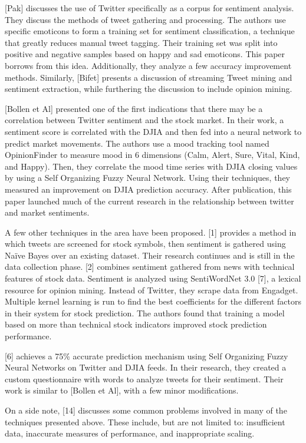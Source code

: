 \documentclass[preprint,pre,floats,aps,amsmath,amssymb,12pt]{revtex4}
\begin{document}
[Pak] discusses the use of Twitter specifically as a corpus for sentiment analysis. They discuss the methods of tweet gathering and processing. The authors use specific emoticons to form a training set for sentiment classification, a technique that greatly reduces manual tweet tagging. Their training set was split into positive and negative samples based on happy and sad emoticons. This paper borrows from this idea. Additionally, they analyze a few accuracy improvement methods. Similarly, [Bifet] presents a discussion of streaming Tweet mining and sentiment extraction, while furthering the discussion to include opinion mining. 

[Bollen et Al] presented one of the first indications that there may be a correlation between Twitter sentiment and the stock market. In their work, a sentiment score is correlated with the DJIA and then fed into a neural network to predict market movements. The authors use a mood tracking tool named OpinionFinder to measure mood in 6 dimensions (Calm, Alert, Sure, Vital, Kind, and Happy). Then, they correlate the mood time series with DJIA closing values by using a Self Organizing Fuzzy Neural Network. Using their techniques, they measured an improvement on DJIA prediction accuracy. After publication, this paper launched much of the current research in the relationship between twitter and market sentiments. 

A few other techniques in the area have been proposed. [1] provides a method in which tweets are screened for stock symbols, then sentiment is gathered using Naïve Bayes over an existing dataset. Their research continues and is still in the data collection phase. [2] combines sentiment gathered from news with technical features of stock data. Sentiment is analyzed using SentiWordNet 3.0 [7], a lexical resource for opinion mining. Instead of Twitter, they scrape data from Engadget. Multiple kernel learning is run to find the best coefficients for the different factors in their system for stock prediction. The authors found that training a model based on more than technical stock indicators improved stock prediction performance. 

[6] achieves a 75\% accurate prediction mechanism using Self Organizing Fuzzy Neural Networks on Twitter and DJIA feeds. In their research, they created a custom questionnaire with words to analyze tweets for their sentiment. Their work is similar to [Bollen et Al], with a few minor modifications.

On a side note, [14] discusses some common problems involved in many of the techniques presented above. These include, but are not limited to: insufficient data, inaccurate measures of performance, and inappropriate scaling. 
\end{document}
